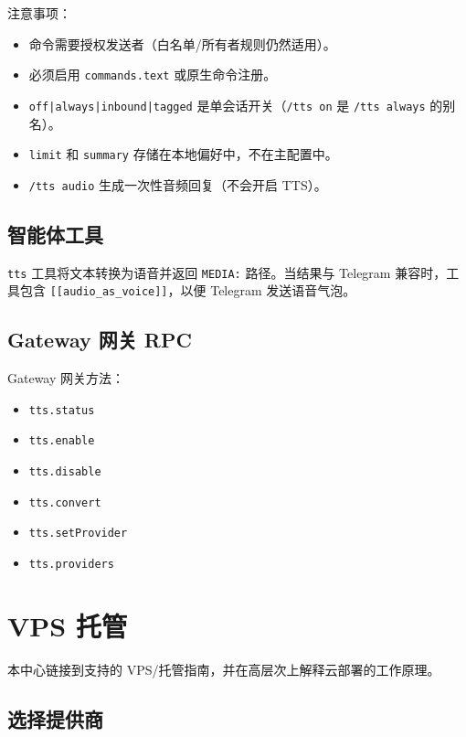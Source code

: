 注意事项：

\begin{itemize}
  \item 命令需要授权发送者（白名单/所有者规则仍然适用）。
  \item 必须启用 \texttt{commands.text} 或原生命令注册。
  \item \texttt{off|always|inbound|tagged} 是单会话开关（\texttt{/tts on} 是 \texttt{/tts always} 的别名）。
  \item \texttt{limit} 和 \texttt{summary} 存储在本地偏好中，不在主配置中。
  \item \texttt{/tts audio} 生成一次性音频回复（不会开启 TTS）。
\end{itemize}


\subsection{智能体工具}


\texttt{tts} 工具将文本转换为语音并返回 \texttt{MEDIA:} 路径。当结果与 Telegram 兼容时，工具包含 \texttt{[[audio\_as\_voice]]}，以便 Telegram 发送语音气泡。

\subsection{Gateway 网关 RPC}


Gateway 网关方法：

\begin{itemize}
  \item \texttt{tts.status}
  \item \texttt{tts.enable}
  \item \texttt{tts.disable}
  \item \texttt{tts.convert}
  \item \texttt{tts.setProvider}
  \item \texttt{tts.providers}
\end{itemize}



\clearpage

\section{VPS 托管}


本中心链接到支持的 VPS/托管指南，并在高层次上解释云部署的工作原理。

\subsection{选择提供商}


